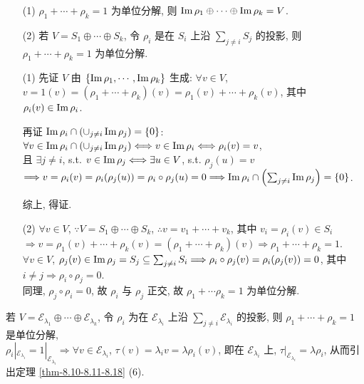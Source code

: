 \documentclass{note}
\begin{document}
\begin{thm}
    \begin{itemize}
        \item[(1)] $\rho_1+\cdots+\rho_k=1$ 为单位分解, 则 $\operatorname{Im}\rho_1\oplus\cdots\oplus\operatorname{Im}\rho_k=V$.
        \item[(2)] 若 $V=S_1\oplus\cdots\oplus S_k$, 令 $\rho_i$ 是在 $S_i$ 上沿 $\sum_{j\neq i}S_j$ 的投影, 则 $\rho_1+\cdots+\rho_k=1$ 为单位分解.
    \end{itemize}
\end{thm}
\begin{pf}
    \begin{itemize}
        \item[(1)] 先证 $V$ 由 $\{\operatorname{Im}\rho_1,\cdots,\operatorname{Im}\rho_k\}$ 生成: $\forall v\in V$, $v=1(v)=(\rho_1+\cdots+\rho_k)(v)=\rho_1(v)+\cdots+\rho_k(v)$, 其中 $\rho_i(v)\in\operatorname{Im}\rho_i$.

        再证 $\operatorname{Im}\rho_i\cap\left(\cup_{j\neq i}\operatorname{Im}\rho_j\right)=\{0\}$: $\forall v\in\operatorname{Im}\rho_i\cap\left(\cup_{j\neq i}\operatorname{Im}\rho_j\right)\Longleftrightarrow v\in\operatorname{Im}\rho_i\Longleftrightarrow\rho_i(v)=v$,\\
        且 $\exists j\neq i$, s.t. $v\in\operatorname{Im}\rho_j\Longleftrightarrow\exists u\in V$, s.t. $\rho_j(u)=v$\\
        $\Longrightarrow v=\rho_i(v)=\rho_i(\rho_j(u))=\rho_i\circ\rho_j(u)=0\Longrightarrow\operatorname{Im}\rho_i\cap\left(\sum_{j\neq i}\operatorname{Im}\rho_j\right)=\{0\}$.

        综上, 得证.
        \item[(2)] $\forall v\in V$, $\because V=S_1\oplus\cdots\oplus S_k$, $\therefore v=v_1+\cdots+v_k$, 其中 $v_i=\rho_i(v)\in S_i$\\
        $\Longrightarrow v=\rho_1(v)+\cdots+\rho_k(v)=(\rho_1+\cdots+\rho_k)(v)\Longrightarrow\rho_1+\cdots+\rho_k=1$.\\
        $\forall v\in V$, $\rho_j(v)\in\operatorname{Im}\rho_j=S_j\subseteq\sum_{j\neq i}S_i\Longrightarrow\rho_i\circ\rho_j(v)=\rho_i(\rho_j(v))=0$, 其中 $i\neq j\Longrightarrow\rho_i\circ\rho_j=0$.\\
        同理, $\rho_j\circ\rho_i=0$, 故 $\rho_i$ 与 $\rho_j$ 正交, 故 $\rho_1+\cdots\rho_k=1$ 为单位分解.
    \end{itemize}
\end{pf}

若 $V=\mathcal{E}_{\lambda_1}\oplus\cdots\oplus\mathcal{E}_{\lambda_k}$, 令 $\rho_i$ 为在 $\mathcal{E}_{\lambda_i}$ 上沿 $\sum_{j\neq i}\mathcal{E}_{\lambda_i}$ 的投影, 则 $\rho_1+\cdots+\rho_k=1$ 是单位分解,\\
$\rho_i|_{\mathcal{E}_{\lambda_i}}=1|_{\mathcal{E}_{\lambda_i}}\Longrightarrow\forall v\in\mathcal{E}_{\lambda_i}$, $\tau(v)=\lambda_iv=\lambda\rho_i(v)$, 即在 $\mathcal{E}_{\lambda_i}$ 上, $\tau|_{\mathcal{E}_{\lambda_i}}=\lambda\rho_i$, 从而引出定理 \ref{thm-8.10-8.11-8.18} (6).
\ifx\allfiles\undefined
\end{document}
